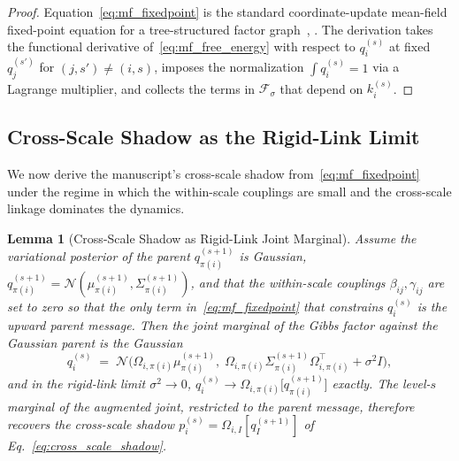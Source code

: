 \documentclass[11pt]{article}
\newtheorem{lemma}{Lemma}
\begin{document}
\begin{proof}
Equation~\eqref{eq:mf_fixedpoint} is the standard coordinate-update mean-field fixed-point equation for a tree-structured factor graph~\cite[Prop.~4.1]{Wainwright2008}, \cite[\S10.1]{Bishop2006}. The derivation takes the functional derivative of~\eqref{eq:mf_free_energy} with respect to $q_i^{(s)}$ at fixed $q_{j}^{(s')}$ for $(j, s') \neq (i, s)$, imposes the normalization $\int q_i^{(s)} = 1$ via a Lagrange multiplier, and collects the terms in $\mathcal{F}_{\sigma}$ that depend on $k_i^{(s)}$.
\end{proof}

\subsection{Cross-Scale Shadow as the Rigid-Link Limit}

We now derive the manuscript's cross-scale shadow from~\eqref{eq:mf_fixedpoint} under the regime in which the within-scale couplings are small and the cross-scale linkage dominates the dynamics.

\begin{lemma}[Cross-Scale Shadow as Rigid-Link Joint Marginal]
\label{lem:shadow_mf_optimum}
Assume the variational posterior of the parent $q_{\pi(i)}^{(s+1)}$ is Gaussian, $q_{\pi(i)}^{(s+1)} = \mathcal{N}(\mu_{\pi(i)}^{(s+1)}, \Sigma_{\pi(i)}^{(s+1)})$, and that the within-scale couplings $\beta_{ij}, \gamma_{ij}$ are set to zero so that the only term in~\eqref{eq:mf_fixedpoint} that constrains $q_i^{(s)}$ is the upward parent message. Then the joint marginal of the Gibbs factor against the Gaussian parent is the Gaussian
\begin{equation}
q_i^{(s)} \;=\; \mathcal{N}\!\big(\Omega_{i,\pi(i)} \mu_{\pi(i)}^{(s+1)},\;\Omega_{i,\pi(i)} \Sigma_{\pi(i)}^{(s+1)} \Omega_{i,\pi(i)}^\top + \sigma^2 I\big),
\label{eq:shadow_soft}
\end{equation}
and in the rigid-link limit $\sigma^2 \to 0$, $q_i^{(s)} \to \Omega_{i,\pi(i)}\big[q_{\pi(i)}^{(s+1)}\big]$ exactly. The level-$s$ marginal of the augmented joint, restricted to the parent message, therefore recovers the cross-scale shadow $p_i^{(s)} = \Omega_{i,I}[q_I^{(s+1)}]$ of Eq.~\eqref{eq:cross_scale_shadow}.
\end{lemma}
\end{document}
